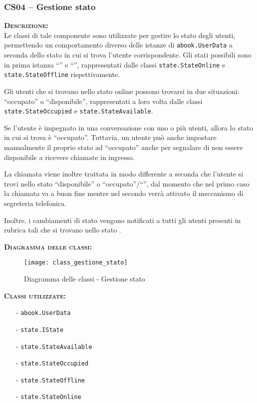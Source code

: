 \subsubsection{CS04 -- Gestione stato}
\begin{description}
	\item{\scshape\bfseries Descrizione:}\\
Le classi di tale componente sono utilizzate per gestire lo stato degli utenti, permettendo un comportamento diverso delle istanze di \texttt{abook.UserData} a seconda dello stato in cui si trova l'utente corrispondente. Gli stati possibili sono in prima istanza ``'' e ``'', rappresentati dalle classi \texttt{state.StateOnline} e \texttt{state.StateOffline} rispettivamente.

Gli utenti che si trovano nello stato online possono trovarsi in due situazioni: ``occupato'' o ``disponibile'', rappresentati a loro volta dalle classi \texttt{state.StateOccupied} e \texttt{state.StateAvailable}.

Se l'utente è impegnato in una conversazione con uno o più utenti, allora lo stato in cui si trova è ``occupato''. Tuttavia, un utente può anche impostare manualmente il proprio stato ad ``occupato'' anche per segnalare di non essere disponibile a ricevere chiamate in ingresso.
	
La chiamata viene inoltre trattata in modo differente a seconda che l'utente si trovi nello stato ``disponibile'' o ``occupato''/``'', dal momento che nel primo caso la chiamata va a buon fine mentre nel secondo verrà attivato il meccanismo di segreteria telefonica.
	
Inoltre, i cambiamenti di stato vengono notificati a tutti gli utenti presenti in rubrica tali che si trovano nello stato .
	\item{\scshape\bfseries Diagramma delle classi:}
\begin{figure}[H]
  \centering
  \texttt{[image: class\_gestione\_stato]}
  \caption{Diagramma delle classi - Gestione stato}\label{fig:gestionestato}
\end{figure}
	
	\item{\scshape\bfseries Classi utilizzate:}\\ 
	\begin{itemize}[noitemsep,nolistsep]
	  \item[-] \texttt{abook.UserData}
	  \item[-] \texttt{state.IState}
	  \item[-] \texttt{state.StateAvailable}
	  \item[-] \texttt{state.StateOccupied}
	  \item[-] \texttt{state.StateOffline}
	  \item[-] \texttt{state.StateOnline}
	\end{itemize}
\end{description}

